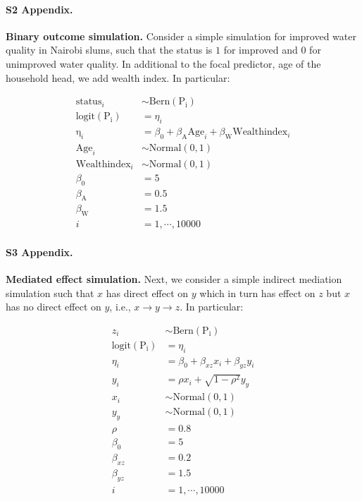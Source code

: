 \paragraph*{S2 Appendix.}
\label{S2_Appendix}
{\bf Binary outcome simulation.} Consider a simple simulation for improved water quality in Nairobi slums, such that the status is $1$ for improved and $0$ for unimproved water quality. In additional to the focal predictor, age of the household head, we add wealth index. In particular:

\begin{align}\label{sim:glm_two_pred}
\mathrm{status}_i &\sim \mathrm{Bern}(\mathrm{P_i}) \nonumber\\
\mathrm{logit}(\mathrm{P_i}) &= \eta_i \nonumber\\
\mathrm{\eta}_i &= \beta_0 + \beta_{\mathrm{A}}\mathrm{Age}_i + \beta_{\mathrm{W}}\mathrm{Wealthindex}_i \nonumber\\
\mathrm{Age}_i &\sim \mathrm{Normal}(0, 1) \nonumber\\
\mathrm{Wealthindex}_i &\sim \mathrm{Normal}(0, 1) \nonumber\\
\beta_0 &= 5 \nonumber\\
\beta_{\mathrm{A}} &= 0.5 \nonumber\\
\beta_{\mathrm{W}} &= 1.5 \nonumber\\
i &= 1,\cdots, 10000
\end{align}

\paragraph*{S3 Appendix.}
\label{S3_Appendix}
{\bf Mediated effect simulation.} Next, we consider a simple indirect mediation simulation such that $x$ has direct effect on $y$ which in turn has effect on $z$ but $x$ has no direct effect on $y$, i.e., $x \rightarrow y \rightarrow z$. In particular:

\begin{align}\label{sim:simple_mediate}
z_i &\sim \mathrm{Bern}(\mathrm{P_i}) \nonumber\\
\mathrm{logit}(\mathrm{P_i}) &= \eta_i \nonumber\\
\eta_i &= \beta_0 + \beta_{xz} x_i + \beta_{yz} y_i \nonumber\\
y_i &= \rho x_i + \sqrt{1-\rho^2} y_y \nonumber\\
x_i &\sim \mathrm{Normal(0, 1)} \nonumber\\
y_y &\sim \mathrm{Normal(0, 1)} \nonumber\\
\rho &= 0.8 \nonumber\\
\beta_0 &= 5 \nonumber\\
\beta_{xz} &= 0.2 \nonumber\\
\beta_{yz} &= 1.5 \nonumber\\
i &= 1,\cdots, 10000
\end{align}


